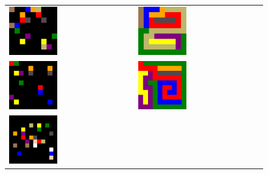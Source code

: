 \documentclass{article}
\begin{document}
\begin{figure}
	\centering
	\begin{tabularx}{\textwidth}{X X}
		\includegraphics[width=0.4\textwidth]{9x9_input.png} &
		\includegraphics[width=0.4\textwidth]{9x9_output.png} \\
		\includegraphics[width=0.4\textwidth]{10x10_input.png} &
		\includegraphics[width=0.4\textwidth]{10x10_output.png} \\
		\includegraphics[width=0.4\textwidth]{12x12_input.png} &

\end{tabularx}
\end{figure}
\end{document}
